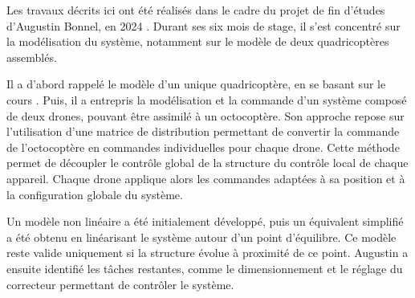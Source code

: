 Les travaux décrits ici ont été réalisés dans le cadre du projet de fin d'études d'Augustin Bonnel, en 2024 \cite{bonnel_modeling_2024}. Durant ses six mois de stage, il s'est concentré sur la modélisation du système, notamment sur le modèle de deux quadricoptères assemblés.

Il a d'abord rappelé le modèle d'un unique quadricoptère, en se basant sur le cours \cite{gangloff_mooc_2023}. Puis, il a entrepris la modélisation et la commande d'un système composé de deux drones, pouvant être assimilé à un octocoptère. Son approche repose sur l'utilisation d'une matrice de distribution permettant de convertir la commande de l'octocoptère en commandes individuelles pour chaque drone. Cette méthode permet de découpler le contrôle global de la structure du contrôle local de chaque appareil. Chaque drone applique alors les commandes adaptées à sa position et à la configuration globale du système.

Un modèle non linéaire a été initialement développé, puis un équivalent simplifié a été obtenu en linéarisant le système autour d'un point d'équilibre. Ce modèle reste valide uniquement si la structure évolue à proximité de ce point. Augustin a ensuite identifié les tâches restantes, comme le dimensionnement et le réglage du correcteur permettant de contrôler le système.